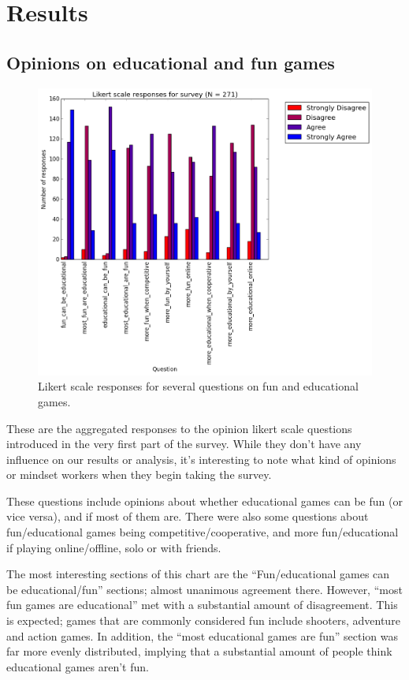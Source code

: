 \chapter{Results}

	\section{Opinions on educational and fun games}
		\begin{figure}[] 
		\centering 
		\includegraphics[width=\textwidth]{survey_likert.png} 
		\caption{Likert scale responses for several questions on fun and educational games.}
		\end{figure}
	These are the aggregated responses to the opinion likert scale questions introduced in the very first part of the survey. While they don't have any influence on our results or analysis, it's interesting to note what kind of opinions or mindset workers when they begin taking the survey.

	These questions include opinions about whether educational games can be fun (or vice versa), and if most of them are. There were also some questions about fun/educational games being competitive/cooperative, and more fun/educational if playing online/offline, solo or with friends.

	The most interesting sections of this chart are the ``Fun/educational games can be educational/fun'' sections; almost unanimous agreement there. However, ``most fun games are educational'' met with a substantial amount of disagreement. This is expected; games that are commonly considered fun include shooters, adventure and action games. In addition, the ``most educational games are fun'' section was far more evenly distributed, implying that a substantial amount of people think educational games aren't fun.

